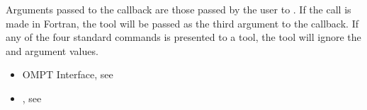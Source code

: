 Arguments passed to the callback are those passed by the user to
. If the call is made in Fortran, the tool
will be passed  as the third argument to the callback. If
any of the four standard commands is presented to a tool, the tool
will ignore the  and  argument values.



\crossreferences
\begin{itemize}
\item OMPT Interface, see
\item {}, see
\end{itemize}

